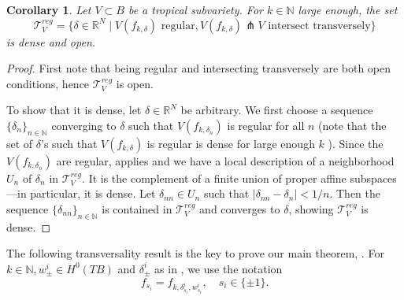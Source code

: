 \documentclass[10pt]{amsart}
\newtheorem{cor}[thm]{Corollary}
\theoremstyle{definition}
\theoremstyle{remark}
\def\N{\mathbb{N}}
\def\R{\mathbb{R}}
\begin{document}
\begin{cor}\label{prop:transversality}
    Let $V \subset B$ be a tropical subvariety.
    For $k\in \N$ large enough, the set
    $$
    \mathcal T^{reg}_V = \{\delta \in \R^N \mid V(f_{k,\delta}) \text{ regular}, V(f_{k,\delta}) \pitchfork V\text{ intersect transversely}\}
    $$
    is dense and open.
\end{cor}
\begin{proof}
    First note that being regular and intersecting transversely are both open conditions, hence $\mathcal T^{reg}_V$ is open.

    To show that it is dense, let $\delta \in \R^N$ be arbitrary.
    We first choose a sequence $\{\delta_n\}_{n\in \N}$ converging to $\delta$ such that $V(f_{k,\delta_n})$ is regular for all $n$ (note that the set of $\delta$'s such that $V(f_{k,\delta})$ is regular is dense for large enough $k$ \cite[Lemma 3.24]{sheridan2021lagrangian}).
    Since the $V(f_{k,\delta_n})$ are regular,  applies and we have a local description of a neighborhood $U_n$ of $\delta_n$ in $\mathcal T^{reg}_V$.
    It is the complement of a finite union of proper affine subspaces---in particular, it is dense. 
    Let $\delta_{nn} \in U_n$ such that $|\delta_{nn} - \delta_n| < 1/n$.
    Then the sequence $\{\delta_{nn}\}_{n\in \N}$ is contained in $\mathcal T^{reg}_V$ and converges  to $\delta$, showing $\mathcal T^{reg}_V$ is dense.
\end{proof}



The following transversality result is the key to prove our main theorem, .
For $k\in \N, w^i_\pm \in H^0(TB)$ and $\delta^i_\pm$ as in , we use the notation
$$
    f_{s_i} = f_{k,\delta^i_{s_i},w^i_{s_i}},\quad s_i \in \{\pm1\}.
$$
\end{document}
